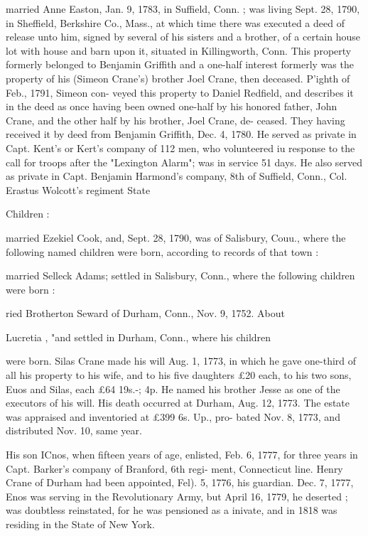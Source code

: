 \documentclass[oneside]{book}
\begin{document}
married Anne Easton, Jan. 9, 1783, in Suffield, Conn. ; was 
living Sept. 28, 1790, in Sheffield, Berkshire Co., Mass., at 
which time there was executed a deed of release unto him, signed 
by several of his sisters and a brother, of a certain house lot with 
house and barn upon it, situated in Killingworth, Conn. This 
property formerly belonged to Benjamin Griffith and a one-half 
interest formerly was the property of his (Simeon Crane's) brother 
Joel Crane, then deceased. P'ighth of Feb., 1791, Simeon con- 
veyed this property to Daniel Redfield, and describes it in the 
deed as once having been owned one-half by his honored father, 
John Crane, and the other half by his brother, Joel Crane, de- 
ceased. They having received it by deed from Benjamin Griffith, 
Dec. 4, 1780. He served as private in Capt. Kent's or Kert's 
company of 112 men, who volunteered iu response to the call for 
troops after the "Lexington Alarm"; was in service 51 days. 
He also served as private in Capt. Benjamin Harmond's company, 
8th of Suffield, Conn., Col. Erastus Wolcott's regiment State 




Children : 


married Ezekiel Cook, and, Sept. 28, 1790, was of Salisbury, 
Couu., where the following named children were born, according 
to records of that town : 





married Selleck Adams; settled in Salisbury, Conn., where the 
following children were born : 







ried Brotherton Seward of Durham, Conn., Nov. 9, 1752. About 






Lucretia , "and settled in Durham, Conn., where his children 

were born. Silas Crane made his will Aug. 1, 1773, in which he 
gave one-third of all his property to his wife, and to his five 
daughters £20 each, to his two sons, Euos and Silas, each £64  
19s.-; 4p. He named his brother Jesse as one of the executors 
of his will. His death occurred at Durham, Aug. 12, 1773. The 
estate was appraised and inventoried at £399  6s.  Up., pro- 
bated Nov. 8, 1773, and distributed Nov. 10, same year. 

His son ICnos, when fifteen years of age, enlisted, Feb. 6, 1777, 
for three years in Capt. Barker's company of Branford, 6th regi- 
ment, Connecticut line. Henry Crane of Durham had been 
appointed, Fel). 5, 1776, his guardian. Dec. 7, 1777, Enos was 
serving in the Revolutionary Army, but April 16, 1779, he 
deserted ; was doubtless reinstated, for he was pensioned as a 
inivate, and in 1818 was residing in the State of New York. 
\end{document}

